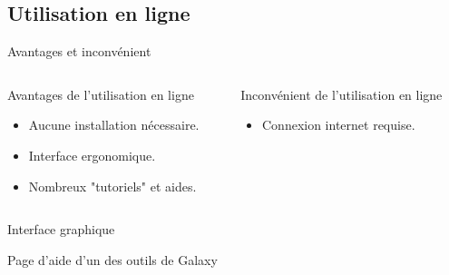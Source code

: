 \documentclass[12pt]{beamer}
\begin{document}
\subsection{Utilisation en ligne}
\begin{frame}{Avantages et inconvénient}
\begin{columns}
\begin{column}{0.5\textwidth}
\begin{block}{Avantages de l'utilisation en ligne}
\begin{itemize}
\item Aucune installation nécessaire.
\item Interface ergonomique.
\item Nombreux "tutoriels" et aides.
\end{itemize}
\end{block}
\end{column}
\begin{column}{0.5\textwidth}
\begin{block}{Inconvénient de l'utilisation en ligne}
\begin{itemize}
\item Connexion internet requise.
\end{itemize}
\end{block}
\end{column}
\end{columns}
\end{frame}

\begin{frame}{Interface graphique}
\scriptsize
{}
\end{frame}

\begin{frame}{Page d'aide d'un des outils de Galaxy}
\scriptsize
{}
\end{frame}
\end{document}
